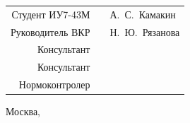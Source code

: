 \begin{center}
\begin{flushright}
  \begin{tabular}{rll}
    Студент ИУ7-43М & \underline{\hspace{6cm}} & А.~С.~Камакин\\[0.5cm]
    Руководитель ВКР & \underline{\hspace{6cm}} & Н.~Ю.~Рязанова\\[0.5cm]
    Консультант & \underline{\hspace{6cm}} & \underline{\hspace{3cm}}\\[0.5cm]
    Консультант & \underline{\hspace{6cm}} & \underline{\hspace{3cm}}\\[0.5cm]
    Нормоконтролер & \underline{\hspace{6cm}} & \underline{\hspace{3cm}}\\[0.5cm]
  \end{tabular}
\end{flushright}

{\large Москва, \the\year}

\end{center}

\thispagestyle{empty}